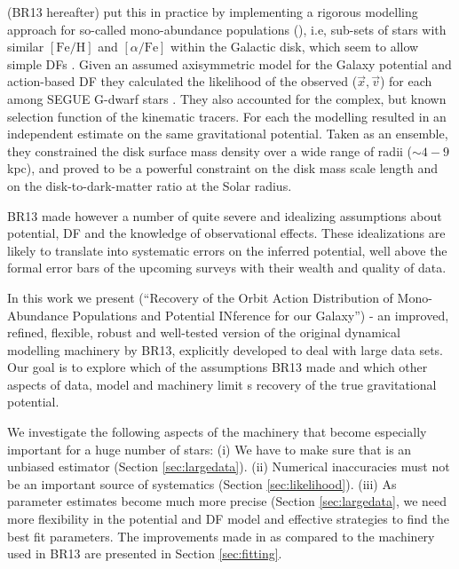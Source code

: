 \citet{2013ApJ...779..115B} (BR13 hereafter) put this in practice by implementing a rigorous modelling approach for so-called mono-abundance populations (\MAPs{}), i.e, sub-sets of stars with similar $[\mathrm{Fe}/\mathrm{H}]$ and $[\alpha/\mathrm{Fe}]$ within the Galactic disk, which seem to allow simple DFs \citep{bov12b,bov12c,2012ApJ...753..148B}. Given an assumed axisymmetric model for the Galaxy potential and action-based DF \citep{2010MNRAS.401.2318B,2011MNRAS.413.1889B,2013MNRAS.434..652T} they calculated the likelihood of the observed ($\vec{x},\vec{v}$) for each \MAP{} among SEGUE G-dwarf stars \citep{2009AJ....137.4377Y}. They also accounted for the complex, but known selection function \citep{2012ApJ...753..148B} of the kinematic tracers. For each \MAP{} the modelling resulted in an independent estimate on the same gravitational potential. Taken as an ensemble, they constrained the disk surface mass density over a wide range of radii ($\sim 4-9$ kpc), and proved to be a powerful constraint on the disk mass scale length and on the disk-to-dark-matter ratio at the Solar radius. 

BR13 made however a number of quite severe and idealizing assumptions about potential, DF and the knowledge of observational effects. These idealizations are likely to translate into systematic errors on the inferred potential, well above the formal error bars of the upcoming surveys with their wealth and quality of data.

In this work we present \RM{} (``\textsc{R}ecovery of the \textsc{O}rbit \textsc{A}ction \textsc{D}istribution of \textsc{M}ono-\textsc{A}bundance \textsc{P}opulations and \textsc{P}otential \textsc{IN}ference for our \textsc{G}alaxy'') - an improved, refined, flexible, robust and well-tested version of the original dynamical modelling machinery by BR13, explicitly developed to deal with large data sets. Our goal is to explore which of the assumptions BR13 made and which other aspects of data, model and machinery limit \RM{}s recovery of the true gravitational potential.

We investigate the following aspects of the \RM{} machinery that become especially important for a huge number of stars: (i) We have to make sure that \RM{} is an unbiased estimator (Section \ref{sec:largedata}). (ii) Numerical inaccuracies must not be an important source of systematics (Section \ref{sec:likelihood}). (iii) As parameter estimates become much more precise (Section \ref{sec:largedata}, we need more flexibility in the potential and DF model and effective strategies to find the best fit parameters. The improvements made in \RM{} as compared to the machinery used in BR13 are presented in Section \ref{sec:fitting}.


